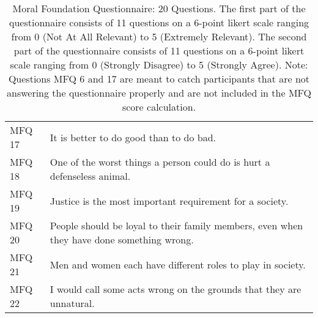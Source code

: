 \begin{table}[!hbpt]
\begin{tabularx}{\linewidth}{l|X}
         MFQ 17 & It is better to do good than to do bad.\\
         MFQ 18 & One of the worst things a person could do is hurt a defenseless animal.\\
         MFQ 19 & Justice is the most important requirement for a society.\\
         MFQ 20 & People should be loyal to their family members, even when they have done something wrong.\\
         MFQ 21 & Men and women each have different roles to play in society.\\
         MFQ 22 & I would call some acts wrong on the grounds that they are unnatural.\\
    \bottomrule
    \end{tabularx}
    \caption{Moral Foundation Questionnaire: 20 Questions. The first part of the questionnaire consists of 11 questions on a 6-point likert scale ranging from 0 (Not At All Relevant) to 5 (Extremely Relevant). The second part of the questionnaire consists of 11 questions on a 6-point likert scale ranging from 0 (Strongly Disagree) to 5 (Strongly Agree). Note: Questions MFQ 6 and 17 are meant to catch participants that are not answering the questionnaire properly and are not included in the MFQ score calculation.}
    \label{app:mfq}
\end{table}